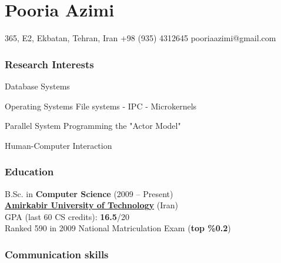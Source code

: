 \documentclass{tccv}
\begin{document}
\part{Pooria Azimi}





\personal
    {365, E2, Ekbatan, Tehran, Iran}
    {+98 (935) 4312645}
    {pooriaazimi@gmail.com}







\section{Research Interests}


\begin{research_interest}

\item{Database Systems}
     {}

\item{Operating Systems}
     {File systems - IPC - Microkernels}

\item{Parallel System Programming}
     {the "Actor Model"}

\item{Human-Computer Interaction}
     {}

\end{research_interest}








\section{Education}

B.Sc. in {\bf\large Computer Science} (2009 -- Present)
\\[1.5pt]
{\bf \href{https://en.wikipedia.org/wiki/Amirkabir_University_of_Technology}{Amirkabir University of Technology}} (Iran)
\\[1.7pt]
GPA (last 60 CS credits): {\bf 16.5}/20
\bigskip\\
Ranked 590 in 2009 National Matriculation Exam ({\bf top \%0.2})








\section{Communication skills}
\end{document}

